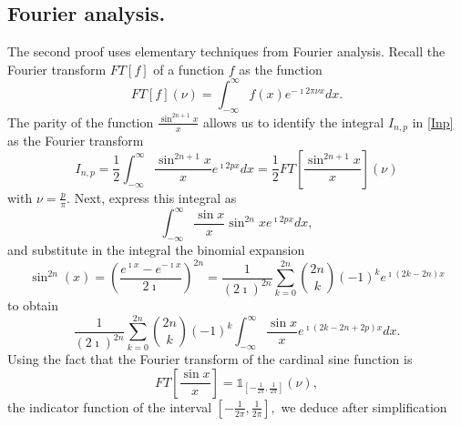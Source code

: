 \documentclass[11pt,oneside,reqno]{article}
\theoremstyle{definition}
\begin{document}
\subsection{Fourier analysis.}
The second proof uses elementary techniques from Fourier analysis. Recall the Fourier transform $FT[f]$ of a function $f$ as the function 
\begin{equation}
FT \left[ f\right](\nu) =  \int_{-\infty}^{\infty}f(x) e^{-\imath2\pi \nu x}dx.
\end{equation}
The parity of the function $\frac{\sin^{2n+1}x}{x}$ allows us to identify the integral $I_{n,p}$ in \eqref{Inp} as the Fourier transform
\begin{equation}
I_{n,p}=
\frac{1}{2}\int_{-\infty}^{\infty}\frac{\sin^{2n+1}x}{x}e^{\imath2px}dx
=\frac{1}{2}FT\left[\frac{\sin^{2n+1}x}{x}\right](\nu)
\end{equation}
with $\nu = \frac{p}{\pi}.$ 
Next, express this integral as 
\begin{equation}
    \int_{-\infty}^{\infty}\frac{\sin x}{x}\sin^{2n}xe^{\imath2px}dx,
\end{equation}
and substitute in the integral 
the binomial expansion
\begin{equation}
\sin^{2n}\left(x\right)
=\left(\frac{e^{\imath x}-e^{-\imath x}}{2\imath}\right)^{2n}
=
\frac{1}{\left(2\imath\right)^{2n}}\sum_{k=0}^{2n}\binom{2n}{k}\left(-1\right)^{k}e^{\imath\left(2k-2n\right)x}
\end{equation}
to obtain
\begin{equation}
 \frac{1}{\left(2\imath\right)^{2n}}\sum_{k=0}^{2n}\binom{2n}{k}
\left(-1\right)^{k}
\int_{-\infty}^{\infty}\frac{\sin x}{x}
 e^{\imath\left(2k-2n+2p\right)x}dx.
\end{equation}
Using the fact that the Fourier transform of the  cardinal sine  function is 
\begin{equation}
FT\left[\frac{\sin x}{x}\right]=\mathds{1}_{\left[-\frac{1}{2\pi},\frac{1}{2\pi}\right]}\left(\nu\right),
\end{equation}
the indicator function of the interval $\left[-\frac{1}{2\pi},\frac{1}{2\pi}\right],$ we deduce after simplification 
\end{document}
